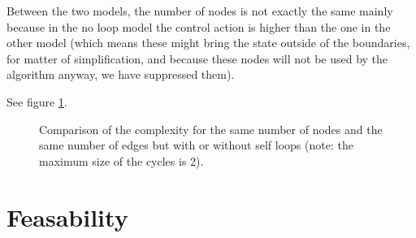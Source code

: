 Between the two models, the number of nodes is not exactly the same mainly because in the no loop model the control action is higher than the one in the other model (which means these might bring the state outside of the boundaries, for matter of simplification, and because these nodes will not be used by the algorithm anyway, we have suppressed them).

See figure \ref{fig:same_nbre_nodes}.

\datasamenode

\begin{figure}
\center
{}
\caption{Comparison of the complexity for the same number of nodes and the same number of edges but with or without self loops (note: the maximum size of the cycles is 2).}
\label{fig:same_nbre_nodes}
\end{figure}

\section{Feasability}
%
%